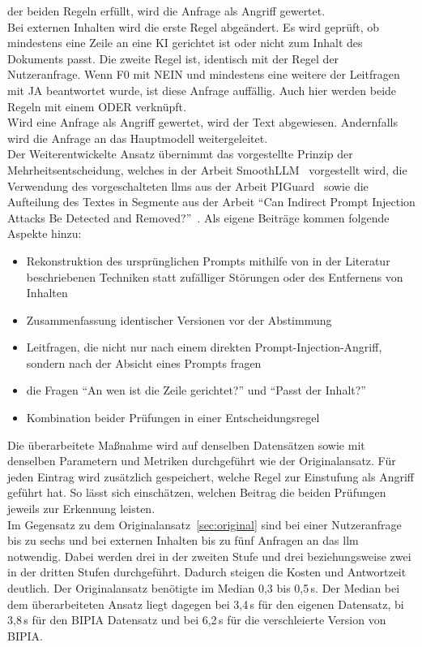 der beiden Regeln erfüllt, wird die Anfrage als Angriff gewertet. \\
Bei externen Inhalten wird die erste Regel abgeändert. Es wird geprüft, ob mindestens eine Zeile an eine KI gerichtet ist oder nicht zum Inhalt des Dokuments passt.
Die zweite Regel ist, identisch mit der Regel der Nutzeranfrage. Wenn F0 mit NEIN und mindestens eine weitere der Leitfragen mit JA beantwortet wurde, ist diese 
Anfrage auffällig. Auch hier werden beide Regeln mit einem ODER verknüpft. \\
Wird eine Anfrage als Angriff gewertet, wird der Text abgewiesen. Andernfalls wird die Anfrage an das Hauptmodell weitergeleitet. \\
Der Weiterentwickelte Ansatz übernimmt das vorgestellte Prinzip der Mehrheitsentscheidung, welches in der Arbeit SmoothLLM~\cite{sm40} vorgestellt wird, die Verwendung des 
vorgeschalteten \ac{llm}s aus der Arbeit PIGuard~\cite[30426]{sm37} sowie die Aufteilung des Textes in Segmente aus der Arbeit 
\enquote{Can Indirect Prompt Injection Attacks Be Detected and Removed?}~\cite[18193]{sm41}. 
Als eigene Beiträge kommen folgende
Aspekte hinzu:
\begin{itemize}
    \item Rekonstruktion des ursprünglichen Prompts mithilfe von in der Literatur beschriebenen Techniken statt zufälliger Störungen oder des Entfernens von Inhalten
    \item Zusammenfassung identischer Versionen vor der Abstimmung
    \item Leitfragen, die nicht nur nach einem direkten Prompt-Injection-Angriff, sondern nach der Absicht eines Prompts fragen
    \item die Fragen \enquote{An wen ist die Zeile gerichtet?} und \enquote{Passt der Inhalt?}
    \item Kombination beider Prüfungen in einer Entscheidungsregel
\end{itemize}
Die überarbeitete Maßnahme wird auf denselben Datensätzen sowie mit denselben Parametern und Metriken durchgeführt wie der Originalansatz. Für jeden Eintrag wird
zusätzlich gespeichert, welche Regel zur Einstufung als Angriff geführt hat. So lässt sich einschätzen, welchen Beitrag die beiden Prüfungen jeweils zur 
Erkennung leisten. \\
Im Gegensatz zu dem Originalansatz~\ref{sec:original} sind bei einer Nutzeranfrage bis zu sechs und bei externen Inhalten bis zu fünf Anfragen an das \ac{llm} notwendig. Dabei werden
drei in der zweiten Stufe und drei beziehungsweise zwei in der dritten Stufen durchgeführt. Dadurch steigen die Kosten und Antwortzeit deutlich. Der Originalansatz
benötigte im Median 0,3 bis 0,5\,s. Der Median bei dem überarbeiteten Ansatz liegt dagegen bei 3,4\,s für den eigenen Datensatz, bi 3,8\,s für den BIPIA Datensatz
und bei 6,2\,s für die verschleierte Version von BIPIA.


